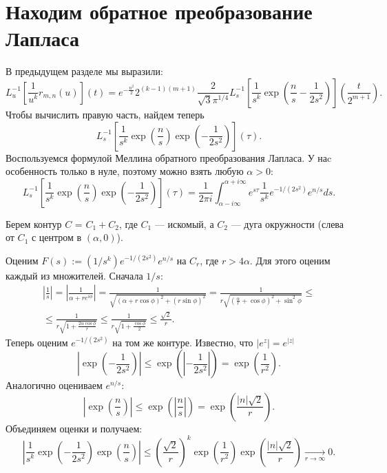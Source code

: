 \documentclass[12pt, a4paper]{report}
\begin{document}
\section{Находим обратное преобразование Лапласа}
В предыдущем разделе мы выразили:
\begin{equation}\label{eq:invlap}
    L^{-1}_u \left[ \frac{1}{u^k} r_{m,n}(u) \right](t) =
%
    e^{-\frac{n^2}{2}} 2^{(k-1)(m+1)} \frac{2}{\sqrt{3} \pi^{1/4}}
    L^{-1}_s \left[ \frac{1}{s^k}
    \exp \left(\frac{n}{s} - \frac{1}{2 s^2 }
    \right)
    \right] \left( \frac{t}{2^{m+1}} \right)
.\end{equation}
Чтобы вычислить правую часть, найдем теперь
\begin{equation}\label{eq:invlap_as_int}
    L^{-1}_s \left[ \frac{1}{s^k}
    \exp \left(\frac{n}{s}\right)
    \exp \left(-\frac{1}{2 s^2 }\right)
    \right] \left( \tau \right)
.\end{equation}
Воспользуемся формулой Меллина обратного преобразования Лапласа. У наc особенность только в нуле, поэтому можно взять любую $\alpha>0$:
\[
    L^{-1}_s \left[ \frac{1}{s^k}
    \exp \left(\frac{n}{s}\right)
    \exp \left(-\frac{1}{2 s^2 }\right)
    \right] \left( \tau \right) =
%
    \frac{1}{2\pi i}\int_{\alpha-i\infty}^{\alpha+i\infty} e^{s\tau} \frac{1}{s^k} e^{-1/(2s^2)} e^{n/s} ds
.\]



Берем контур $C$ = $C_1 + C_2$, где $C_1$ --- искомый, а $C_2$ --- дуга окружности (слева от $C_1$ с центром в $(\alpha, 0)$).

Оценим $F(s) := (1/s^k) e^{-1/(2s^2)} e^{n/s}$ на $C_r$, где $r > 4\alpha$. Для этого оценим каждый из множителей. Сначала $1/s$:
\begin{multline*}
    \left|\frac{1}{s}\right| = 
    \left|\frac{1}{\alpha+re^{i\phi}}\right| =
    \frac{1}{\sqrt{\left(\alpha+r\cos\phi\right)^2 + \left(r\sin\phi\right)^2}} =
    \frac{1}{r\sqrt{\left(\frac{\alpha}{r} + \cos\phi\right)^2 + \sin^2\phi}}
\le \\ \le
    \frac{1}{r\sqrt{1 + \frac{2\alpha\cos\phi}{r}}} \le
    \frac{1}{r\sqrt{1 + \frac{\cos\phi}{2}}} \le
    \frac{\sqrt{2}}{r} 
.\end{multline*}
Теперь оценим $e^{-1/(2s^2)}$ на том же контуре. Известно, что $|e^{z}| = e^{|z|}$
\[
    \left|\exp\left(-\frac{1}{2s^2}\right)\right| \le
    \exp\left(\left|-\frac{1}{2s^2}\right|\right) =
    \exp\left(\frac{1}{r^2}\right)
.\]
Аналогично оцениваем $e^{n/s}$:
\[
    \left| \exp\left( \frac{n}{s} \right)  \right| \le 
    \exp\left(\left| \frac{n}{s} \right|\right) =
    \exp\left( \frac{|n|\sqrt{2} }{r} \right) 
.\]
Объединяем оценки и получаем:
\[
    \left|\frac{1}{s^k} \exp\left(-\frac{1}{2s^2}\right) \exp\left(\frac{n}{s}\right)\right| \le
    \left(\frac{\sqrt{2}}{r}\right)^k \exp\left(\frac{1}{r^2}\right) \exp\left(\frac{|n|\sqrt{2}}{r}\right)
    \xrightarrow[r \to \infty]{} 0
.\]
\end{document}
